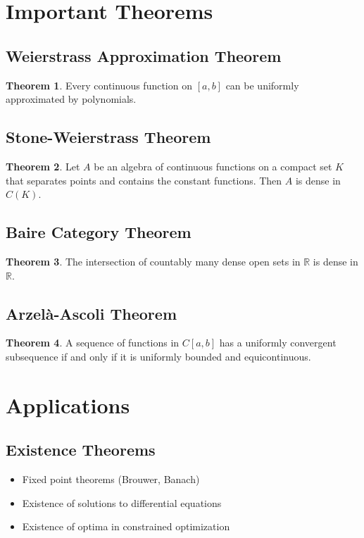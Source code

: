 \documentclass[11pt]{article}
\theoremstyle{definition}
\newtheorem{theorem}{Theorem}[section]
\begin{document}
\section{Important Theorems}

\subsection{Weierstrass Approximation Theorem}
\begin{theorem}
Every continuous function on $[a,b]$ can be uniformly approximated by polynomials.
\end{theorem}

\subsection{Stone-Weierstrass Theorem}
\begin{theorem}
Let $A$ be an algebra of continuous functions on a compact set $K$ that separates points and contains the constant functions. Then $A$ is dense in $C(K)$.
\end{theorem}

\subsection{Baire Category Theorem}
\begin{theorem}
The intersection of countably many dense open sets in $\mathbb{R}$ is dense in $\mathbb{R}$.
\end{theorem}

\subsection{Arzelà-Ascoli Theorem}
\begin{theorem}
A sequence of functions in $C[a,b]$ has a uniformly convergent subsequence if and only if it is uniformly bounded and equicontinuous.
\end{theorem}

\section{Applications}

\subsection{Existence Theorems}
\begin{itemize}
    \item Fixed point theorems (Brouwer, Banach)
    \item Existence of solutions to differential equations
    \item Existence of optima in constrained optimization
\end{itemize}
\end{document}
